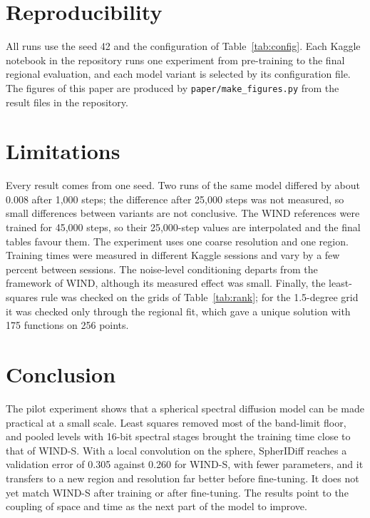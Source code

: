 \documentclass{article}
\begin{document}
\section{Reproducibility}

All runs use the seed 42 and the configuration of Table~\ref{tab:config}. Each Kaggle notebook in the repository runs one experiment from pre-training to the final regional evaluation, and each model variant is selected by its configuration file. The figures of this paper are produced by \texttt{paper/make\_figures.py} from the result files in the repository.

\section{Limitations}

Every result comes from one seed. Two runs of the same model differed by about 0.008 after 1,000 steps; the difference after 25,000 steps was not measured, so small differences between variants are not conclusive. The WIND references were trained for 45,000 steps, so their 25,000-step values are interpolated and the final tables favour them. The experiment uses one coarse resolution and one region. Training times were measured in different Kaggle sessions and vary by a few percent between sessions. The noise-level conditioning departs from the framework of WIND, although its measured effect was small. Finally, the least-squares rule was checked on the grids of Table~\ref{tab:rank}; for the 1.5-degree grid it was checked only through the regional fit, which gave a unique solution with 175 functions on 256 points.

\section{Conclusion}

The pilot experiment shows that a spherical spectral diffusion model can be made practical at a small scale. Least squares removed most of the band-limit floor, and pooled levels with 16-bit spectral stages brought the training time close to that of WIND-S. With a local convolution on the sphere, SpherIDiff reaches a validation error of 0.305 against 0.260 for WIND-S, with fewer parameters, and it transfers to a new region and resolution far better before fine-tuning. It does not yet match WIND-S after training or after fine-tuning. The results point to the coupling of space and time as the next part of the model to improve.
\end{document}
